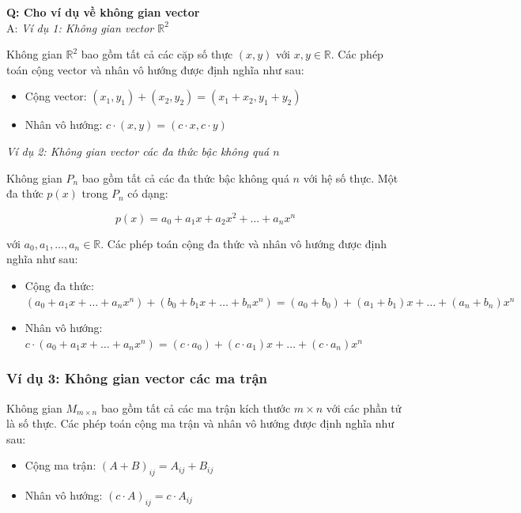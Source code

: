 \textbf{Q: Cho ví dụ về không gian vector}\\
A: \textit{Ví dụ 1: Không gian vector $\mathbb{R}^2$}

Không gian $\mathbb{R}^2$ bao gồm tất cả các cặp số thực $(x, y)$ với $x, y \in \mathbb{R}$. Các phép toán cộng vector và nhân vô hướng được định nghĩa như sau:

\begin{itemize}
    \item Cộng vector: $(x_1, y_1) + (x_2, y_2) = (x_1 + x_2, y_1 + y_2)$
    \item Nhân vô hướng: $c \cdot (x, y) = (c \cdot x, c \cdot y)$
\end{itemize}

\textit{Ví dụ 2: Không gian vector các đa thức bậc không quá $n$}

Không gian $P_n$ bao gồm tất cả các đa thức bậc không quá $n$ với hệ số thực. Một đa thức $p(x)$ trong $P_n$ có dạng:

\[
p(x) = a_0 + a_1 x + a_2 x^2 + \ldots + a_n x^n
\]

với $a_0, a_1, \ldots, a_n \in \mathbb{R}$. Các phép toán cộng đa thức và nhân vô hướng được định nghĩa như sau:

\begin{itemize}
    \item Cộng đa thức: $(a_0 + a_1 x + \ldots + a_n x^n) + (b_0 + b_1 x + \ldots + b_n x^n) = (a_0 + b_0) + (a_1 + b_1) x + \ldots + (a_n + b_n) x^n$
    \item Nhân vô hướng: $c \cdot (a_0 + a_1 x + \ldots + a_n x^n) = (c \cdot a_0) + (c \cdot a_1) x + \ldots + (c \cdot a_n) x^n$
\end{itemize}

\subsubsection*{Ví dụ 3: Không gian vector các ma trận}

Không gian $M_{m \times n}$ bao gồm tất cả các ma trận kích thước $m \times n$ với các phần tử là số thực. Các phép toán cộng ma trận và nhân vô hướng được định nghĩa như sau:

\begin{itemize}
    \item Cộng ma trận: $(A + B)_{ij} = A_{ij} + B_{ij}$
    \item Nhân vô hướng: $(c \cdot A)_{ij} = c \cdot A_{ij}$
\end{itemize}

